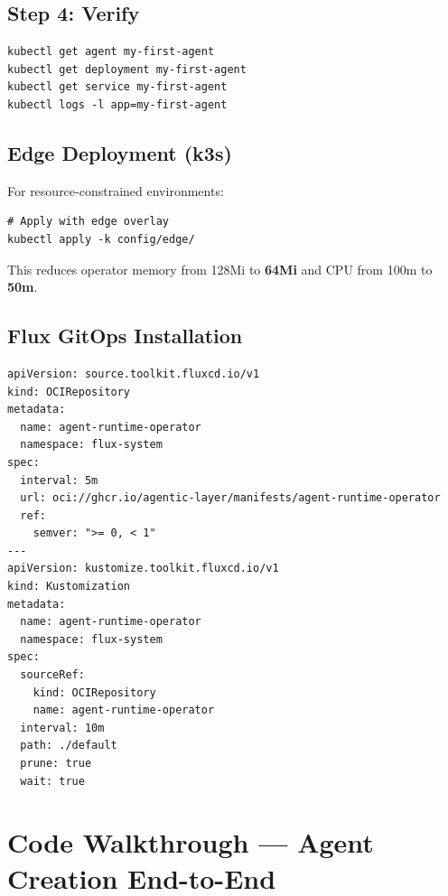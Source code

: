 \documentclass[12pt,a4paper,openany]{report}
\begin{document}
\section{Step 4: Verify}

\begin{lstlisting}[style=bash, caption={Verify the deployment}]
kubectl get agent my-first-agent
kubectl get deployment my-first-agent
kubectl get service my-first-agent
kubectl logs -l app=my-first-agent
\end{lstlisting}

\section{Edge Deployment (k3s)}

For resource-constrained environments:

\begin{lstlisting}[style=bash, caption={Deploy with edge profile}]
# Apply with edge overlay
kubectl apply -k config/edge/
\end{lstlisting}

This reduces operator memory from 128Mi to \textbf{64Mi} and CPU from 100m to \textbf{50m}.

\section{Flux GitOps Installation}

\begin{lstlisting}[style=yaml, caption={Flux OCI installation}]
apiVersion: source.toolkit.fluxcd.io/v1
kind: OCIRepository
metadata:
  name: agent-runtime-operator
  namespace: flux-system
spec:
  interval: 5m
  url: oci://ghcr.io/agentic-layer/manifests/agent-runtime-operator
  ref:
    semver: ">= 0, < 1"
---
apiVersion: kustomize.toolkit.fluxcd.io/v1
kind: Kustomization
metadata:
  name: agent-runtime-operator
  namespace: flux-system
spec:
  sourceRef:
    kind: OCIRepository
    name: agent-runtime-operator
  interval: 10m
  path: ./default
  prune: true
  wait: true
\end{lstlisting}


\chapter{Code Walkthrough — Agent Creation End-to-End}
\end{document}
